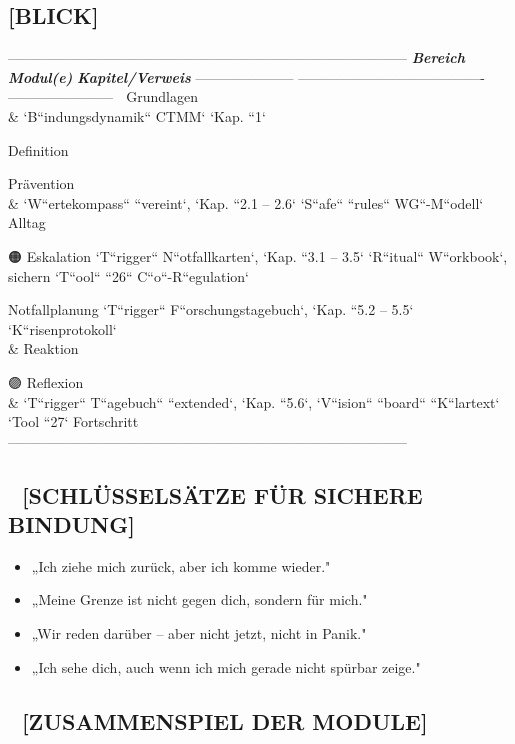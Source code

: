 \subsection{ \textbf{[BLICK]}}

--------------------------------------------------------------------------------------
\textbf{\textit{Bereich}}         \textbf{\textit{Modul(e)}}                           \textbf{\textit{Kapitel/Verweis}}
--------------------- ---------------------------------------- -----------------------
🔵 Grundlagen \\&       `B``indungsdynamik`` \textcolor{ctmmBlue}{CTMM}`               `Kap. ``1`

Definition

\textcolor{ctmmGreen}{} Prävention \\&       `W``ertekompass`` ``vereint`,            `Kap. ``2.1 -- 2.6`
`S``afe`` ``rules`` WG``-M``odell`
Alltag

🟠 Eskalation         `T``rigger`` N``otfallkarten`,           `Kap. ``3.1 -- 3.5`
`R``itual`` W``orkbook`,
sichern               `T``ool`` ``26`` C``o``-R``egulation`

\textcolor{ctmmRed}{} Notfallplanung     `T``rigger`` F``orschungstagebuch`,      `Kap. ``5.2 -- 5.5`
`K``risenprotokoll`
\\& Reaktion

🟣 Reflexion \\&        `T``rigger`` T``agebuch`` ``extended`,   `Kap. ``5.6`,
`V``ision`` ``board`` ``K``lartext`      `Tool ``27`
Fortschritt
--------------------------------------------------------------------------------------

\subsection{\textbf{💬 [SCHLÜSSELSÄTZE FÜR SICHERE BINDUNG]}}

\begin{itemize}
\item   „Ich ziehe mich zurück, aber ich komme wieder."
\item   „Meine Grenze ist nicht gegen dich, sondern für mich."
\item   „Wir reden darüber -- aber nicht jetzt, nicht in Panik."
\item   „Ich sehe dich, auch wenn ich mich gerade nicht spürbar zeige."
\end{itemize}

\subsection{\textbf{🔗 [ZUSAMMENSPIEL DER MODULE]}}

